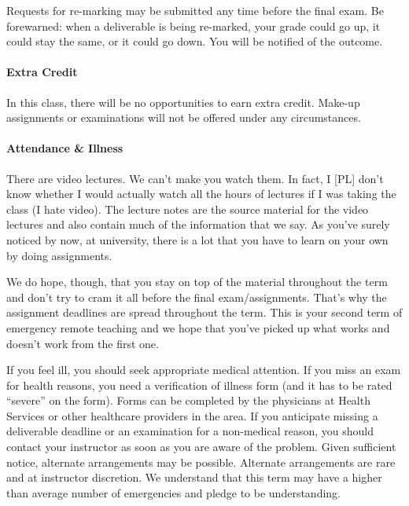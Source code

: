 \documentclass[letterpaper,10pt]{article}
\begin{document}
Requests for re-marking may be submitted any time before the final exam. Be forewarned: when a deliverable is being re-marked, your grade could go up, it could stay the same, or it could go down. You will be notified of the outcome.

\paragraph{Extra Credit}
In this class, there will be no opportunities to earn extra credit. Make-up assignments or examinations will not be offered under any circumstances.

\paragraph{Attendance \& Illness}

There are video lectures. We can't make you watch them. In fact, I [PL] don't know whether I would actually watch all the hours of lectures if I was taking the class (I hate video). The lecture notes are the source material for the video lectures and also contain much of the information that we say. As you've surely noticed by now, at university, there is a lot that you have to learn on your own by doing assignments.

We do hope, though, that you stay on top of the material throughout the term and don't try to cram it all before the final exam/assignments. That's why the assignment deadlines are spread throughout the term. This is your second term of emergency remote teaching and we hope that you've picked up what works and doesn't work from the first one.



If you feel ill, you should seek appropriate medical attention. If you miss an exam for health reasons, you need a verification of illness form (and it has to be rated ``severe'' on the form). Forms can be completed by the physicians at Health Services or other healthcare providers in the area. If you anticipate missing a deliverable deadline or an examination for a non-medical reason, you should contact your instructor as soon as you are aware of the problem. Given sufficient notice, alternate arrangements may be possible. Alternate arrangements are rare and at instructor discretion. We understand that this term may have a higher than average number of emergencies and pledge to be understanding.
\end{document}
